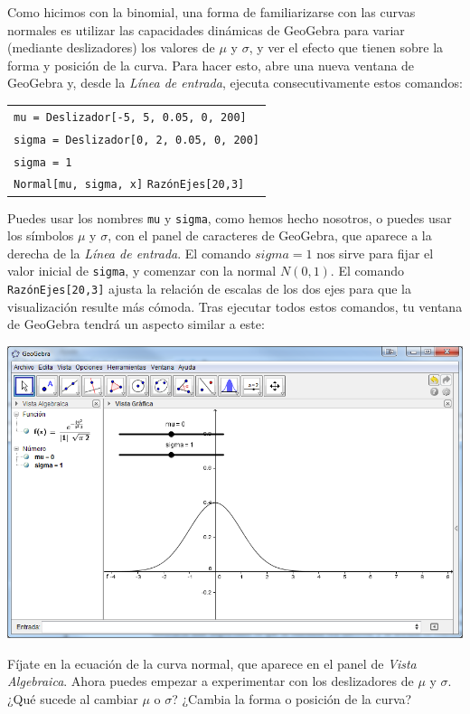 \documentclass[10pt,a4paper]{article}\usepackage[]{graphicx}\usepackage[]{color}
\begin{document}
Como hicimos con la binomial, una forma de familiarizarse con las curvas normales es utilizar las capacidades dinámicas de GeoGebra para variar (mediante deslizadores) los valores de $\mu$ y $\sigma$, y ver el efecto que tienen sobre la forma y posición de la curva. Para hacer esto, abre una nueva ventana de GeoGebra y, desde la  {\em Línea de entrada}, ejecuta consecutivamente estos comandos:
\begin{center}
\begin{tabular}{l}
{\tt  mu = Deslizador[-5, 5, 0.05, 0, 200]}\\
{\tt  sigma = Deslizador[0, 2, 0.05, 0, 200]}\\
{\tt  sigma = 1}\\
{\tt Normal[mu, sigma, x]}
{\tt RazónEjes[20,3]}
\end{tabular}
\end{center}
Puedes usar los nombres {\tt mu} y {\tt sigma}, como hemos hecho nosotros, o puedes usar los símbolos $\mu$ y $\sigma$, con el panel de caracteres de GeoGebra, que aparece a la derecha de la  {\em Línea de entrada}. El comando $sigma = 1$ nos sirve para fijar el valor inicial de {\tt sigma}, y comenzar con la normal $N(0, 1)$. El comando {\tt RazónEjes[20,3]} ajusta la relación de escalas de los dos ejes para que la visualización resulte más cómoda. Tras ejecutar todos estos comandos, tu ventana de GeoGebra tendrá un aspecto similar a este:
\begin{center}
\includegraphics[width=15cm]{../fig/Tut05-63.png}
\end{center}
Fíjate en la ecuación de la curva normal, que aparece en el panel de {\em Vista Algebraica}. Ahora puedes empezar a experimentar con los deslizadores de $\mu$ y $\sigma$. ¿Qué sucede al cambiar $\mu$ o $\sigma$? ¿Cambia la forma o posición de la curva?
\end{document}
